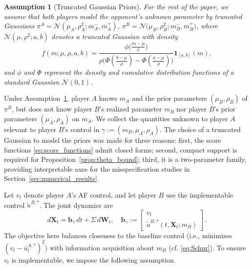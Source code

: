\documentclass[letterpaper, 10 pt, conference]{ieeeconf}
\newtheorem{assumption}{Assumption}
\begin{document}
\begin{assumption}[Truncated Gaussian Priors]\label{assu:truncated_gaussian_form}
    For the rest of the paper, we assume that both players model the opponent's unknown parameter by truncated Gaussians $
        \pi^A = \mathcal{N}(\mu_A, \rho_A^2; m_A^-, m_A^+)$, $\pi^B = \mathcal{N}\big(\mu_B, \rho_B^2; m_B^-, m_B^+\big)$, 
    where $\mathcal{N}(\mu, \rho^2; a, b)$ denotes a truncated Gaussian with density
    \begin{equation}\label{eq:truncated_Gaussian_density}
        f(m; \mu, \rho, a, b) = \frac{\phi\big(\tfrac{m-\mu}{\rho}\big)}{\rho\big(\Phi(\tfrac{b-\mu}{\rho}) - \Phi (\tfrac{a-\mu}{\rho})\big)}\mathbf{1}_{[a, b]}(m),
    \end{equation}
    and $\phi$ and $\Phi$ represent the density and cumulative distribution functions of a standard  Gaussian $\mathcal{N}(0,1)$.
\end{assumption}

Under Assumption~\ref{assu:truncated_gaussian_form}, player \(A\) knows \(m_A\) and the prior parameters \((\mu_B,\rho_B)\) of \(\pi^B\), but does not know player \(B\)'s realized parameter \(m_B\) nor player \(B\)'s prior parameters \((\mu_A,\rho_A)\) on $m_A$. We collect the quantities unknown to player $A$ relevant to player \(B\)'s control in $\gamma := (m_B,\mu_A,\rho_A)$.  
The choice of a truncated Gaussian to model the priors was made for three reasons: first, the score functions \eqref{eq:score_functions} admit closed forms; second, compact support is required for Proposition~\ref{prop:theta_bound}; third, it is a two-parameter family, providing interpretable axes for the misspecification studies in Section~\ref{sec:numerical_results}.

Let \(v_t\) denote player \(A\)'s AF control, and let player \(B\) use the implementable control \(\widetilde u^{B,*}\). The joint dynamics are
\begin{equation}\label{eq:dynamics_AF}
d\bm X_t
=
\bm b_\gamma\,dt
+
\Sigma\,d\bm W_t,
\quad
\bm b_\gamma
:=
\begin{bmatrix}
v_t\\
\widetilde u^{B,*}(t,\bm X_t;m_B)
\end{bmatrix}.
\end{equation}
The objective here balances closeness to the baseline control (i.e., minimizes $(v_t - \overline{u}^{A,*}_t)^2$) with information acquisition about $m_B$ (cf. \eqref{eq:Schur}). To ensure $v_t$ is implementable, we impose the following assumption.
\end{document}
